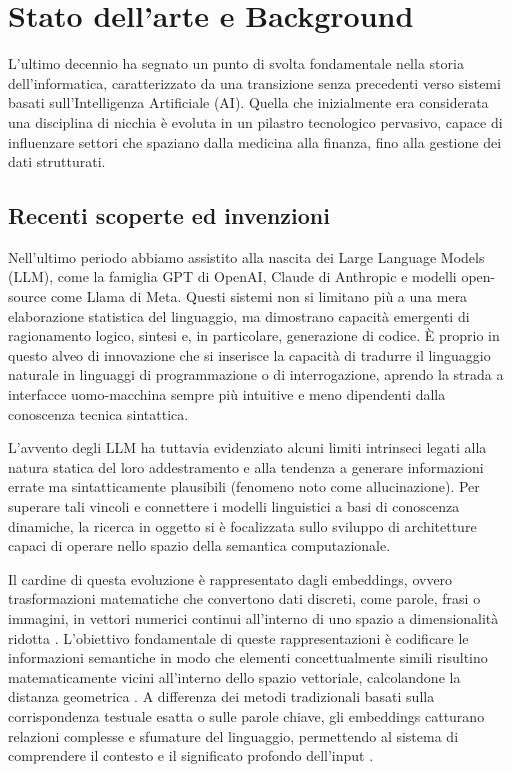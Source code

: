 \chapter{Stato dell'arte e Background}
\label{cha:intro}

L'ultimo decennio ha segnato un punto di svolta fondamentale nella storia
dell'informatica, caratterizzato da una transizione senza precedenti
verso sistemi basati sull'Intelligenza Artificiale (AI). Quella che
inizialmente era considerata una disciplina di nicchia è evoluta in un
pilastro tecnologico pervasivo, capace di influenzare settori che
spaziano dalla medicina alla finanza, fino alla gestione dei dati
strutturati.

\section{Recenti scoperte ed invenzioni}\label{recenti-scoperte-ed-invenzioni}

Nell'ultimo periodo abbiamo assistito alla nascita dei Large Language
Models (LLM), come la famiglia GPT di OpenAI, Claude di Anthropic e
modelli open-source come Llama di Meta. Questi sistemi non si limitano
più a una mera elaborazione statistica del linguaggio, ma dimostrano
capacità emergenti di ragionamento logico, sintesi e, in particolare,
generazione di codice. È proprio in questo alveo di innovazione che si
inserisce la capacità di tradurre il linguaggio naturale in linguaggi di
programmazione o di interrogazione, aprendo la strada a interfacce
uomo-macchina sempre più intuitive e meno dipendenti dalla conoscenza
tecnica sintattica.

L'avvento degli LLM ha tuttavia evidenziato alcuni limiti intrinseci
legati alla natura statica del loro addestramento e alla tendenza a
generare informazioni errate ma sintatticamente plausibili (fenomeno
noto come allucinazione). Per superare tali vincoli e connettere
i modelli linguistici a basi di conoscenza dinamiche, la ricerca in oggetto si è
focalizzata sullo sviluppo di architetture capaci di operare nello
spazio della semantica computazionale.

Il cardine di questa evoluzione è rappresentato dagli embeddings, ovvero
trasformazioni matematiche che convertono dati discreti, come parole,
frasi o immagini, in vettori numerici continui all'interno di uno spazio
a dimensionalità ridotta \cite{geeksforgeeks2024embeddings}. L'obiettivo fondamentale di queste
rappresentazioni è codificare le informazioni semantiche in modo che
elementi concettualmente simili risultino matematicamente vicini
all'interno dello spazio vettoriale, calcolandone la distanza geometrica
\cite{wang-etal-2024-improving-text}. A differenza dei metodi tradizionali basati sulla
corrispondenza testuale esatta o sulle parole chiave, gli embeddings
catturano relazioni complesse e sfumature del linguaggio, permettendo al
sistema di comprendere il contesto e il significato profondo dell'input
\cite{thinkia2025vectordatabases}.

